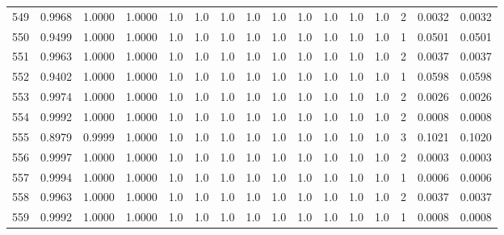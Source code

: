 \begin{tabular}{lrrrrrrrrrrrrrrr}
549 &      0.9968 &  1.0000 &  1.0000 &     1.0 &     1.0 &     1.0 &     1.0 &     1.0 &     1.0 &     1.0 &      1.0 &        1.0 &      2 &                    0.0032 &                     0.0032 \\
550 &      0.9499 &  1.0000 &  1.0000 &     1.0 &     1.0 &     1.0 &     1.0 &     1.0 &     1.0 &     1.0 &      1.0 &        1.0 &      1 &                    0.0501 &                     0.0501 \\
551 &      0.9963 &  1.0000 &  1.0000 &     1.0 &     1.0 &     1.0 &     1.0 &     1.0 &     1.0 &     1.0 &      1.0 &        1.0 &      2 &                    0.0037 &                     0.0037 \\
552 &      0.9402 &  1.0000 &  1.0000 &     1.0 &     1.0 &     1.0 &     1.0 &     1.0 &     1.0 &     1.0 &      1.0 &        1.0 &      1 &                    0.0598 &                     0.0598 \\
553 &      0.9974 &  1.0000 &  1.0000 &     1.0 &     1.0 &     1.0 &     1.0 &     1.0 &     1.0 &     1.0 &      1.0 &        1.0 &      2 &                    0.0026 &                     0.0026 \\
554 &      0.9992 &  1.0000 &  1.0000 &     1.0 &     1.0 &     1.0 &     1.0 &     1.0 &     1.0 &     1.0 &      1.0 &        1.0 &      2 &                    0.0008 &                     0.0008 \\
555 &      0.8979 &  0.9999 &  1.0000 &     1.0 &     1.0 &     1.0 &     1.0 &     1.0 &     1.0 &     1.0 &      1.0 &        1.0 &      3 &                    0.1021 &                     0.1020 \\
556 &      0.9997 &  1.0000 &  1.0000 &     1.0 &     1.0 &     1.0 &     1.0 &     1.0 &     1.0 &     1.0 &      1.0 &        1.0 &      2 &                    0.0003 &                     0.0003 \\
557 &      0.9994 &  1.0000 &  1.0000 &     1.0 &     1.0 &     1.0 &     1.0 &     1.0 &     1.0 &     1.0 &      1.0 &        1.0 &      1 &                    0.0006 &                     0.0006 \\
558 &      0.9963 &  1.0000 &  1.0000 &     1.0 &     1.0 &     1.0 &     1.0 &     1.0 &     1.0 &     1.0 &      1.0 &        1.0 &      2 &                    0.0037 &                     0.0037 \\
559 &      0.9992 &  1.0000 &  1.0000 &     1.0 &     1.0 &     1.0 &     1.0 &     1.0 &     1.0 &     1.0 &      1.0 &        1.0 &      1 &                    0.0008 &                     0.0008 \\

\end{tabular}
